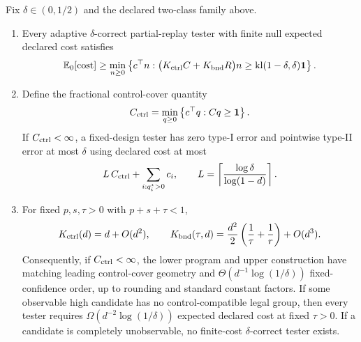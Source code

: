 \begin{theorem}
\label{thm:control-replay}
Fix \(\delta\in(0,1/2)\) and the declared two-class family above.

\begin{enumerate}[label=(\roman*)]
\item Every adaptive \(\delta\)-correct partial-replay tester with finite null
expected declared cost satisfies
\begin{equation}\label{eq:formal-results-051}
\mathbb{E}_0[\mathrm{cost}]
\ge
\min_{n\ge0}
\left\{
c^\top n:
\bigl(K_{\rm ctrl}C+K_{\rm bnd}R\bigr)n
\ge
\mathrm{kl}(1-\delta,\delta)\mathbf 1
\right\}.
\end{equation}

\item Define the fractional control-cover quantity
\begin{equation}\label{eq:formal-results-052}
C_{\rm ctrl}
=
\min_{q\ge0}
\left\{
c^\top q:
Cq\ge\mathbf 1
\right\}.
\end{equation}
If \(C_{\rm ctrl}<\infty\), a fixed-design tester has zero type-I error and
pointwise type-II error at most \(\delta\) using declared cost at most
\begin{equation}\label{eq:formal-results-053}
L\,C_{\rm ctrl}
+
\sum_{i:q_i^\star>0}c_i,
\qquad
L=
\left\lceil
\frac{\log\delta}{\log(1-d)}
\right\rceil.
\end{equation}

\item For fixed \(p,s,\tau>0\) with \(p+s+\tau<1\),
\begin{equation}\label{eq:formal-results-054}
K_{\rm ctrl}(d)=d+O(d^2),
\qquad
K_{\rm bnd}(\tau,d)
=
\frac{d^2}{2}
\left(
\frac1\tau+\frac1r
\right)
+O(d^3).
\end{equation}
Consequently, if \(C_{\rm ctrl}<\infty\), the lower program and upper
construction have matching leading control-cover geometry and
\(\Theta(d^{-1}\log(1/\delta))\) fixed-confidence order, up to rounding and
standard constant factors.  If some observable high candidate has no
control-compatible legal group, then every tester requires
\(\Omega(d^{-2}\log(1/\delta))\) expected declared cost at fixed
\(\tau>0\).  If a candidate is completely unobservable, no finite-cost
\(\delta\)-correct tester exists.


\end{enumerate}
\end{theorem}
